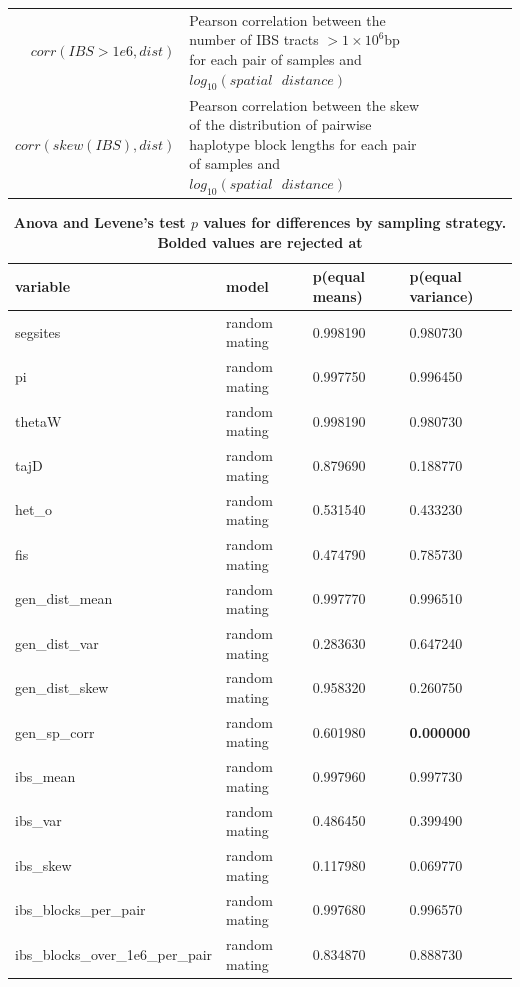 \documentclass[11pt,twoside,lineno]{preprint}
\begin{document}
\begin{table}
\begin{tabular}{rllrrrrr}
$corr(IBS>1e6,dist)$ & \makecell[l]{Pearson correlation between the number of IBS tracts $> 1\times10^6$bp \\for each pair of samples and $log_{10}(spatial\text{ }distance)$} \\
$corr(skew(IBS),dist)$ & \makecell[l]{Pearson correlation between the skew of the distribution of pairwise haplotype\\ block lengths for each pair of samples and $log_{10}(spatial\text{ }distance)$} \\
\end{tabular}
\label{table:sumstats}
\end{table}


\begin{table}[htbp]
\tiny
\centering
\caption{\bf Anova and Levene's test $p$ values for differences by sampling strategy. Bolded values are rejected at }
\begin{tableminipage}{\textwidth}
\begin{tabularx}{\textwidth}{XXXX}
  \hline
 variable & model & p(equal means) & p(equal variance) \\ 
  \hline
segsites & random mating & 0.998190 & 0.980730 \\ 
pi & random mating & 0.997750 & 0.996450 \\ 
thetaW & random mating & 0.998190 & 0.980730 \\ 
tajD & random mating & 0.879690 & 0.188770 \\ 
het\_o & random mating & 0.531540 & 0.433230 \\ 
fis & random mating & 0.474790 & 0.785730 \\ 
gen\_dist\_mean & random mating & 0.997770 & 0.996510 \\ 
gen\_dist\_var & random mating & 0.283630 & 0.647240 \\ 
gen\_dist\_skew & random mating & 0.958320 & 0.260750 \\ 
gen\_sp\_corr & random mating & 0.601980 &\textbf{0.000000} \\ 
ibs\_mean & random mating & 0.997960 & 0.997730 \\ 
ibs\_var & random mating & 0.486450 & 0.399490 \\ 
ibs\_skew & random mating & 0.117980 & 0.069770 \\ 
ibs\_blocks\_per\_pair & random mating & 0.997680 & 0.996570 \\ 
ibs\_blocks\_over\_1e6\_per\_pair & random mating & 0.834870 & 0.888730 \\ 

\end{tabularx}
\end{tableminipage}
\end{table}
\end{document}
